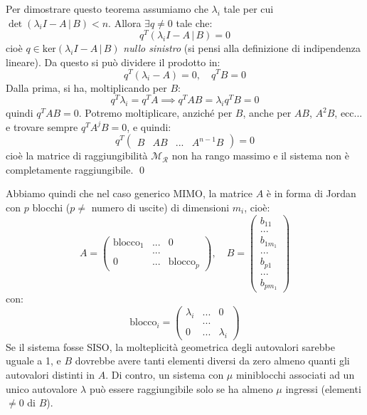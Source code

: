 \documentclass[a4paper,11pt]{article}
\begin{document}
\begin{itemize}
		Per dimostrare questo teorema assumiamo che $\lambda_i$ tale per cui $\det(\lambda_i I - A \, | \, B) < n$. 
		Allora $\exists q \neq 0$ tale che:
		$$
			q^T (\lambda_i I - A \, | \, B) = 0
		$$
		cioè $q \in \mathrm{ker}(\lambda_i I - A \, | \, B)$ \textit{nullo sinistro} (si pensi alla definizione di indipendenza lineare).
		Da questo si può dividere il prodotto in:
		$$
		q^T (\lambda_i - A) = 0, \quad q^T B = 0
		$$
		Dalla prima, si ha, moltiplicando per $B$:
		$$
		q^T \lambda_i = q^T A \implies q^T A B = \lambda_i q^T B = 0
		$$
		quindi $q^T A B = 0$.
		Potremo moltiplicare, anziché per $B$, anche per $AB$, $A^2 B$, ecc... e trovare sempre $q^T A^j B = 0$, e quindi:
		$$
		q^T \begin{pmatrix}
			B & AB & ... & A^{n - 1} B
		\end{pmatrix} = 0
		$$
		cioè la matrice di raggiungibilità $\mathcal{M}_\mathcal{R}$ non ha rango massimo e il sistema non è completamente raggiungibile. \qed

		Abbiamo quindi che nel caso generico MIMO, la matrice $A$ è in forma di Jordan con $p$ blocchi ($p \neq$ numero di uscite) di dimensioni $m_i$, cioè:		
		$$
			A = \begin{pmatrix}
				\text{blocco}_1 & ... & 0 \\
												& ... & \\
				0 & ... & \text{blocco}_p
			\end{pmatrix}, \quad B = \begin{pmatrix}
				b_{11} \\ ... \\ b_{1m_1} \\ ... \\ b_{p1} \\ ... \\ b_{pm_1}
			\end{pmatrix}
		$$
		con:
		$$
			\text{blocco}_i = \begin{pmatrix}
				\lambda_i & ... & 0 \\
				& ... & \\ 
				0 & ... & \lambda_i
			\end{pmatrix}
		$$
		Se il sistema fosse SISO, la molteplicità geometrica degli autovalori sarebbe uguale a 1, e $B$ dovrebbe avere tanti elementi diversi da zero almeno quanti gli autovalori distinti in $A$.
	Di contro, un sistema con $\mu$ miniblocchi associati ad un unico autovalore $\lambda$ può essere raggiungibile solo se ha almeno $\mu$ ingressi (elementi $\neq 0$ di $B$).
\end{itemize}
\end{document}
